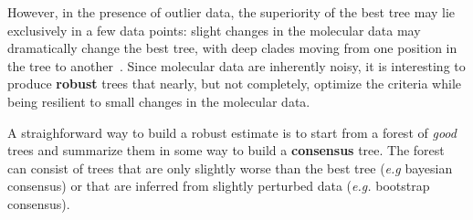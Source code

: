 However, in the presence of outlier data, the superiority of the best tree may lie exclusively in a few data points: slight changes in the molecular data may dramatically change the best tree, with deep clades moving from one position in the tree to another~\citep{Bar-Hen2008}. Since molecular data are inherently noisy, it is interesting to produce \textbf{robust} trees that nearly, but not completely, optimize the criteria while being resilient to small changes in the molecular data. 

A straighforward way to build a robust estimate is to start from a forest of \emph{good} trees and summarize them in some way to build a \textbf{consensus} tree. The forest can consist of trees that are only slightly worse than the best tree (\emph{e.g} bayesian consensus) or that are inferred from slightly perturbed data (\emph{e.g.} bootstrap consensus). 